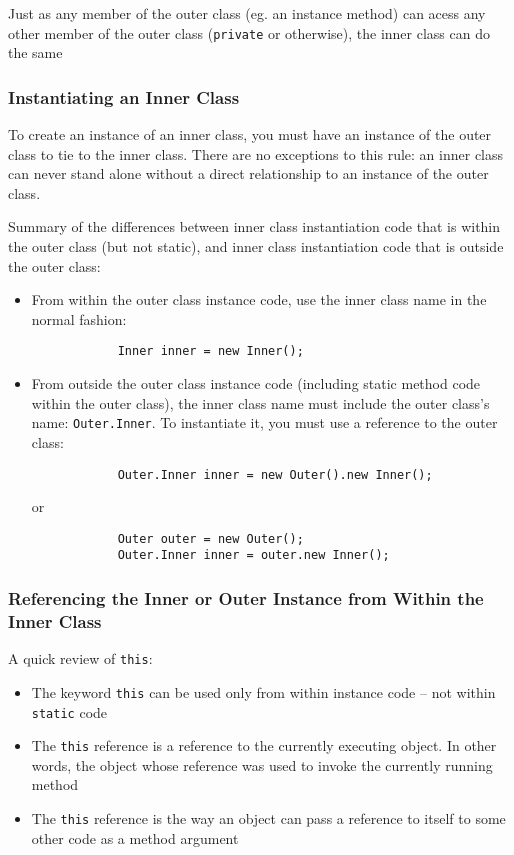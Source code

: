 Just as any member of the outer class (eg. an instance method) can acess any 
other member of the outer class (\verb#private# or otherwise), the inner class 
can do the same

\subsubsection{Instantiating an Inner Class}
To create an instance of an inner class, you must have an instance of the outer 
class to tie to the inner class. There are no exceptions to this rule: an inner 
class can never stand alone without a direct relationship to an instance of the 
outer class.

Summary of the differences between inner class instantiation code that is 
within the outer class (but not static), and inner class instantiation code 
that is outside the outer class:
\begin{itemize}
    \item From within the outer class instance code, use the inner class name 
    in the normal fashion:
        \begin{verbatim}
            Inner inner = new Inner();
        \end{verbatim}
    \item From outside the outer class instance code (including static method code 
    within the outer class), the inner class name must include the outer 
    class's name: \verb#Outer.Inner#. To instantiate it, you must use a 
    reference to the outer class:
        \begin{verbatim}
            Outer.Inner inner = new Outer().new Inner();
        \end{verbatim}
    or
        \begin{verbatim}
            Outer outer = new Outer();
            Outer.Inner inner = outer.new Inner();
        \end{verbatim}
\end{itemize}

\subsubsection{Referencing the Inner or Outer Instance from Within the Inner 
Class}
A quick review of \verb#this#:
\begin{itemize}
    \item The keyword \verb#this# can be used only from within instance code -- 
    not within \verb#static# code
    \item The \verb#this# reference is a reference to the currently executing 
    object. In other words, the object whose reference was used to invoke the 
    currently running method
    \item The \verb#this# reference is the way an object can pass a reference 
    to itself to some other code as a method argument
\end{itemize}

